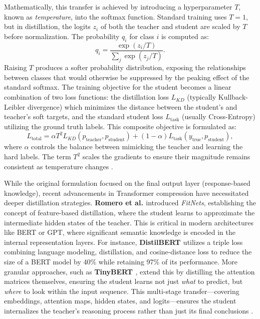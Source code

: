 Mathematically, this transfer is achieved by introducing a hyperparameter $T$, known as \textit{temperature}, into the softmax function. Standard training uses $T=1$, but in distillation, the logits $z_i$ of both the teacher and student are scaled by $T$ before normalization. The probability $q_i$ for class $i$ is computed as:
\begin{equation}
    q_i = \frac{\exp(z_i / T)}{\sum_j \exp(z_j / T)}.
    \label{eq:softmax_temp}
\end{equation}
Raising $T$ produces a softer probability distribution, exposing the relationships between classes that would otherwise be suppressed by the peaking effect of the standard softmax. The training objective for the student becomes a linear combination of two loss functions: the distillation loss $L_{KD}$ (typically Kullback-Leibler divergence) which minimizes the distance between the student's and teacher's soft targets, and the standard student loss $L_{\text{task}}$ (usually Cross-Entropy) utilizing the ground truth labels. This composite objective is formulated as:
\begin{equation}
    L_{\text{total}} = \alpha T^2 L_{KD}(p_{\text{teacher}}, p_{\text{student}}) + (1-\alpha) L_{\text{task}}(y_{\text{true}}, p_{\text{student}}),
    \label{eq:kd_loss}
\end{equation}
where $\alpha$ controls the balance between mimicking the teacher and learning the hard labels. The term $T^2$ scales the gradients to ensure their magnitude remains consistent as temperature changes \cite{hinton2015distilling}.

While the original formulation focused on the final output layer (response-based knowledge), recent advancements in Transformer compression have necessitated deeper distillation strategies. \textbf{Romero et al. \cite{romero2014fitnets}} introduced \textit{FitNets}, establishing the concept of feature-based distillation, where the student learns to approximate the intermediate hidden states of the teacher. This is critical in modern architectures like BERT or GPT, where significant semantic knowledge is encoded in the internal representation layers. For instance, \textbf{DistilBERT \cite{sanh2019distilbert}} utilizes a triple loss combining language modeling, distillation, and cosine-distance loss to reduce the size of a BERT model by 40\% while retaining 97\% of its performance. More granular approaches, such as \textbf{TinyBERT \cite{jiao2020tinybert}}, extend this by distilling the attention matrices themselves, ensuring the student learns not just \textit{what} to predict, but \textit{where} to look within the input sequence. This multi-stage transfer—covering embeddings, attention maps, hidden states, and logits—ensures the student internalizes the teacher's reasoning process rather than just its final conclusions \cite{gou2021knowledge}.

